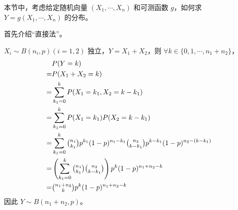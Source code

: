 \documentclass[../main.tex]{subfiles}
\begin{document}
本节中，考虑给定随机向量 $(X_1,\cdots,X_n)$ 和可测函数 $g$，如何求 $Y=g(X_1,\cdots,X_n)$ 的分布。

首先介绍“直接法”。

\begin{example}
    $X_i\sim B(n_i,p)(i=1,2)$ 独立，$Y=X_1+X_2$，则 $\forall k\in\{0,1,\cdots,n_1+n_2\}$，
    \begin{equation*}
        \begin{aligned}
              & P(Y=k)                                                                                               \\
            = & P(X_1+X_2=k)                                                                                         \\
            = & \sum_{k_1=0}^kP(X_1=k_1,X_2=k-k_1)                                                                   \\
            = & \sum_{k_1=0}^kP(X_1=k_1)P(X_2=k-k_1)                                                                 \\
            = & \sum_{k_1=0}^k\tbinom{n_1}{k_1}p^{k_1}(1-p)^{n_1-k_1}\tbinom{n_2}{k-k_1}p^{k-k_1}(1-p)^{n_2-(k-k_1)} \\
            = & \left(\sum_{k_1=0}^k\tbinom{n_1}{k_1}\tbinom{n_2}{k-k_1}\right)p^k(1-p)^{n_1+n_2-k}                  \\
            = & \tbinom{n_1+n_2}{k}p^k(1-p)^{n_1+n_2-k}
        \end{aligned}
    \end{equation*}
    因此 $Y\sim B(n_1+n_2,p)$。
\end{example}
\end{document}
